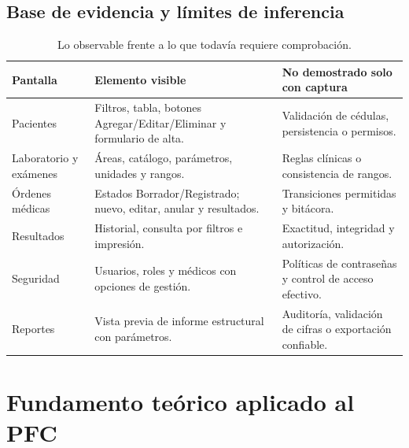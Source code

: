 \subsection{Base de evidencia y límites de inferencia}
\begin{table}[H]\centering\scriptsize
\caption{Lo observable frente a lo que todavía requiere comprobación.}\label{tab:evidencias}
\begin{tabularx}{\linewidth}{@{}p{3cm}Xp{3.8cm}@{}}\toprule
\textbf{Pantalla} & \textbf{Elemento visible} & \textbf{No demostrado solo con captura}\\\midrule
Pacientes & Filtros, tabla, botones Agregar/Editar/Eliminar y formulario de alta. & Validación de cédulas, persistencia o permisos.\\
Laboratorio y exámenes & Áreas, catálogo, parámetros, unidades y rangos. & Reglas clínicas o consistencia de rangos.\\
Órdenes médicas & Estados Borrador/Registrado; nuevo, editar, anular y resultados. & Transiciones permitidas y bitácora.\\
Resultados & Historial, consulta por filtros e impresión. & Exactitud, integridad y autorización.\\
Seguridad & Usuarios, roles y médicos con opciones de gestión. & Políticas de contraseñas y control de acceso efectivo.\\
Reportes & Vista previa de informe estructural con parámetros. & Auditoría, validación de cifras o exportación confiable.\\\bottomrule
\end{tabularx}
\end{table}



\section{Fundamento teórico aplicado al PFC}

